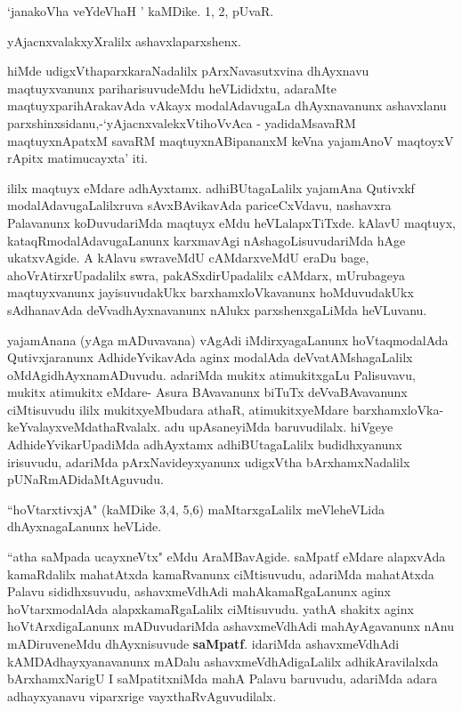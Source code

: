 \begin{artha}
`janakoVha veYdeVhaH \mdash ' kaMDike. 1, 2, pUvaR.

yAjacnxvalakxyXralilx ashavxlaparxshenx.

hiMde udigxVthaparxkaraNadalilx pArxNavasutxvina dhAyxnavu maqtuyxvanunx 
pariharisuvudeMdu heVLididxtu, adaraMte maqtuyxparihArakavAda vAkayx modalAdavugaLa 
dhAyxnavanunx ashavxlanu parxshinxsidanu,-`yAjacnxvalekxVtihoVvAca - yadidaMsavaRM maqtuyxnA\s\s patxM savaRM maqtuyxnA\s BipananxM keVna yajamAnoV maqtoyxV rApitx matimucayxta' iti.

ililx maqtuyx eMdare adhAyxtamx. adhiBUtagaLalilx yajamAna Qutivxkf 
modalAdavugaLalilxruva sAvxBAvikavAda pariceCxVdavu, nashavxra Palavanunx koDuvudariMda 
maqtuyx eMdu heVLalapxTiTxde. kAlavU maqtuyx, kataqRmodalAdavugaLanunx karxmavAgi 
nAshagoLisuvudariMda hAge ukatxvAgide. A kAlavu swraveMdU cAMdarxveMdU eraDu bage, 
ahoVrAtirxrUpadalilx swra, pakASxdirUpadalilx cAMdarx, mUrubageya maqtuyxvanunx 
jayisuvudakUkx barxhamxloVkavanunx hoMduvudakUkx sAdhanavAda deVvadhAyxnavanunx nAlukx 
parxshenxgaLiMda heVLuvanu.
\end{artha}

\centerline{}

\begin{artha}
yajamAnana (yAga mADuvavana) vAgAdi iMdirxyagaLanunx hoVtaqmodalAda Qutivxjaranunx AdhideYvikavAda aginx modalAda deVvatAMshagaLalilx oMdAgidhAyxnamADuvudu. adariMda mukitx atimukitxgaLu Palisuvavu, mukitx atimukitx eMdare- Asura BAvavanunx biTuTx deVvaBAvavanunx ciMtisuvudu ililx mukitxyeMbudara athaR, atimukitxyeMdare barxhamxloVka-keYvalayxveMdathaRvalalx. adu upAsaneyiMda baruvudilalx. hiVgeye AdhideYvikarUpadiMda adhAyxtamx adhiBUtagaLalilx budidhxyanunx irisuvudu, adariMda pArxNavideyxyanunx udigxVtha bArxhamxNadalilx pUNaRmADidaMtAguvudu.
\end{artha}

\begin{artha}
``hoVtarxtivxjA" (kaMDike 3,4, 5,6) maMtarxgaLalilx meVleheVLida dhAyxnagaLanunx heVLide.
\end{artha}

\centerline{}

\begin{artha}
``atha saMpada ucayxneVtx" eMdu AraMBavAgide. saMpatf eMdare alapxvAda kamaRdalilx mahatAtxda kamaRvanunx ciMtisuvudu, adariMda mahatAtxda Palavu sididhxsuvudu, ashavxmeVdhAdi mahAkamaRgaLanunx aginx hoVtarxmodalAda alapxkamaRgaLalilx ciMtisuvudu.  yathA shakitx aginx hoVtArxdigaLanunx mADuvudariMda ashavxmeVdhAdi mahAyAgavanunx nAnu mADiruveneMdu dhAyxnisuvude \textbf{saMpatf}. idariMda ashavxmeVdhAdi kAMDAdhayxyanavanunx mADalu ashavxmeVdhAdigaLalilx adhikAravilalxda bArxhamxNarigU I saMpatitxniMda mahA Palavu baruvudu, adariMda adara adhayxyanavu viparxrige vayxthaRvAguvudilalx.
\end{artha}

